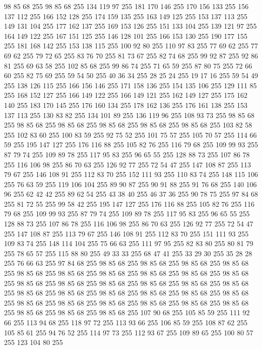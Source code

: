 98 85 68 255 98 85 68 255 134 119 97 255 181 170 146 255 170 156 133 255 156 137 112 255 166 152 128 255 174 159 135 255 163 149 125 255 153 137 113 255 149 131 104 255 177 162 137 255 169 153 126 255 151 133 104 255 139 121 97 255 164 149 122 255 167 151 125 255 146 128 101 255 166 153 130 255 190 177 155 255 181 168 142 255 153 138 115 255 100 92 80 255 110 97 83 255 77 69 62 255 77 69 62 255 79 72 65 255 83 76 70 255 81 73 67 255 82 74 68 255 99 92 87 255 92 86 81 255 69 63 58 255 102 85 68 255 99 86 74 255 71 65 59 255 87 80 75 255 72 66 60 255 82 75 69 255 59 54 50 255 40 36 34 255 28 25 24 255 19 17 16 255 59 54 49 255 138 126 115 255 166 156 146 255 171 158 136 255 154 135 106 255 129 111 85 255 168 152 127 255 166 149 122 255 166 149 121 255 162 149 127 255 175 162 140 255 183 170 145 255 176 160 134 255 178 162 136 255 176 161 138 255 153 137 113 255 130 83 82 255 134 101 89 255 136 119 96 255 108 93 73 255 98 85 68 255
98 85 68 255 98 85 68 255 98 85 68 255 98 85 68 255 98 85 68 255 103 82 58 255 102 83 60 255 100 83 59 255 92 75 52 255 101 75 57 255 105 70 57 255 114 66 59 255 195 147 127 255 176 116 88 255 105 82 76 255 116 79 68 255 109 99 93 255 87 79 74 255 109 89 78 255 117 95 83 255 96 65 55 255 128 88 73 255 107 86 78 255 116 106 98 255 86 70 63 255 126 92 77 255 72 54 47 255 147 108 87 255 113 79 67 255 146 108 91 255 112 83 70 255 152 111 93 255 110 83 74 255 148 115 106 255 76 63 59 255 119 106 104 255 89 90 87 255 90 91 88 255 91 76 68 255 140 106 96 255 62 42 42 255 89 62 54 255 43 38 40 255 46 37 36 255 90 78 75 255 97 84 68 255 81 72 55 255 99 58 42 255 195 147 127 255 176 116 88 255 105 82 76 255 116 79 68 255 109 99 93 255 87 79 74 255 109 89 78 255 117 95 83 255 96 65 55 255 128 88 73 255 107 86 78 255 116 106 98 255 86 70 63 255 126 92 77 255 72 54 47 255 147 108 87 255
113 79 67 255 146 108 91 255 112 83 70 255 151 111 93 255 109 83 74 255 148 114 104 255 75 66 63 255 111 97 95 255 82 83 80 255 80 81 79 255 78 65 57 255 115 88 80 255 49 33 33 255 68 47 41 255 33 29 30 255 35 28 28 255 76 66 63 255 97 84 68 255 98 85 68 255 98 85 68 255 98 85 68 255 98 85 68 255 98 85 68 255 98 85 68 255 98 85 68 255 98 85 68 255 98 85 68 255 98 85 68 255 98 85 68 255 98 85 68 255 98 85 68 255 98 85 68 255 98 85 68 255 98 85 68 255 98 85 68 255 98 85 68 255 98 85 68 255 98 85 68 255 98 85 68 255 98 85 68 255 98 85 68 255 98 85 68 255 98 85 68 255 98 85 68 255 98 85 68 255 98 85 68 255 98 85 68 255 98 85 68 255 98 85 68 255 107 90 68 255 105 85 59 255 111 92 66 255 113 94 68 255 118 97 72 255 113 93 66 255 106 85 59 255 108 87 62 255 105 85 61 255 94 76 52 255 114 97 73 255 112 93 67 255 109 89 65 255 100 80 57 255 123 104 80 255
